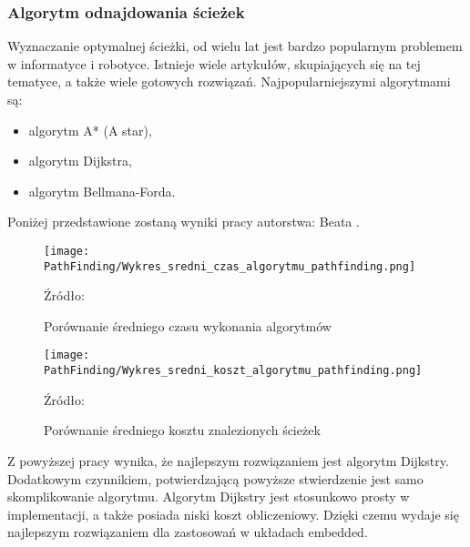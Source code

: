         \subsubsection{Algorytm odnajdowania ścieżek}
        \label{subsec:algorytm_odnajdowania_ścieżek}
            Wyznaczanie optymalnej ścieżki, od wielu lat jest bardzo popularnym problemem w informatyce i robotyce.
            Istnieje wiele artykułów, skupiających się na tej tematyce, a także wiele gotowych rozwiązań.
            Najpopularniejszymi algorytmami są:
            \begin{itemize}
                \item algorytm A* (A star),
                \item algorytm Dijkstra,
                \item algorytm Bellmana-Forda.
            \end{itemize}

            Poniżej przedstawione zostaną wyniki pracy  \cite{AnalizaAlgorytmówŚcieżek}
            autorstwa: Beata \citeauthor{AnalizaAlgorytmówŚcieżek}.
            \begin{figure}[!ht]
                \centering
                \figurePlotName
                \texttt{[image: PathFinding/Wykres\_sredni\_czas\_algorytmu\_pathfinding.png]}
                \caption{Porównanie średniego czasu wykonania algorytmów}
                Źródło:\cite{AnalizaAlgorytmówŚcieżek} 
                \label{fig:PathFindingTime}
            \end{figure}
            \begin{figure}[!ht]
                \centering
                \figurePlotName
                \texttt{[image: PathFinding/Wykres\_sredni\_koszt\_algorytmu\_pathfinding.png]}
                \caption{Porównanie średniego kosztu znalezionych ścieżek}
                Źródło:\cite{AnalizaAlgorytmówŚcieżek} 
                \label{fig:PathFindingCost}
            \end{figure}

            Z powyższej pracy wynika, że najlepszym rozwiązaniem jest algorytm Dijkstry.
            Dodatkowym czynnikiem, potwierdzającą powyższe stwierdzenie jest samo skomplikowanie algorytmu.
            Algorytm Dijkstry jest stosunkowo prosty w implementacji, a także posiada niski koszt obliczeniowy.
            Dzięki czemu wydaje się najlepszym rozwiązaniem dla zastosowań w układach embedded.


